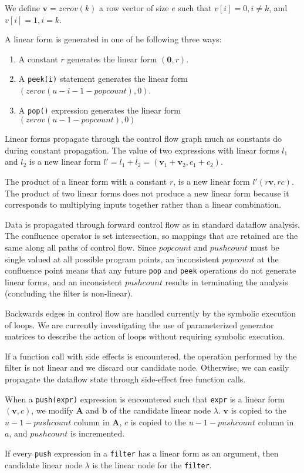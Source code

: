 We define ${\mathbf v} = zerov(k)$ a row vector of size $e$ such that 
$v[i]=0, i \neq k$, and $v[i]=1,i=k$.

A linear form is generated in one of he following three ways:
\begin{enumerate}
\item A constant $r$ generates the linear form $({\mathbf 0},r)$. 
\vspace{-6pt}

\item A {\tt peek(i)} statement generates the linear form 
$(zerov(u-i-1-popcount), 0)$.
\vspace{-6pt}

\item A {\tt pop()} expression generates the linear form 
$(zerov(u-1-popcount),0)$

\vspace{-6pt}
\end{enumerate}

Linear forms propagate through the control flow graph much as constants do
during constant propagation. The value of two expressions with linear forms $l_1$ 
and $l_2$ is a new linear form $l'=l_1+l_2=({\mathbf v}_1+{\mathbf v}_2, c_1+c_2)$.

The product of a linear form with a constant $r$, is a new linear form 
$l' (r{\mathbf v},rc)$. The product of two linear forms does not produce a 
new linear form because it corresponds to multiplying inputs together rather than
a linear combination. 

Data is propagated through forward control flow as in standard dataflow analysis. 
The confluence operator is set intersection, so mappings that are retained are the same 
along all paths of control flow. Since $popcount$ and $pushcount$ must be single
valued at all possible program points, an inconsistent $popcount$ at the
confluence point means that any future {\tt pop} and {\tt peek} operations
do not generate linear forms, and an inconsistent $pushcount$ results in
terminating the analysis (concluding the filter is non-linear).

Backwards edges in control flow are handled currently by the symbolic execution
of loops. We are currently investigating the use of parameterized generator matrices 
to describe the action of loops without requiring symbolic execution.

If a function call with side effects is encountered, the operation performed
by the filter is not linear and we discard our candidate node. Otherwise, 
we can easily propagate the dataflow state through side-effect free function calls. 

When a {\tt push(expr)} expression is encountered such that {\tt expr} is a linear form 
$({\mathbf v},c)$, we modify ${\mathbf A}$ and ${\mathbf b}$ of the candidate linear node $\lambda$.
${\mathbf v}$ is copied to the $u-1-pushcount$ column in ${\mathbf A}$,
$c$ is copied to the $u-1-pushcount$ column in $a$, and $pushcount$ is incremented.

If every {\tt push} expression in a {\tt filter} has a linear form as
an argument, then candidate linear node $\lambda$ is the linear node
for the {\tt filter}.
